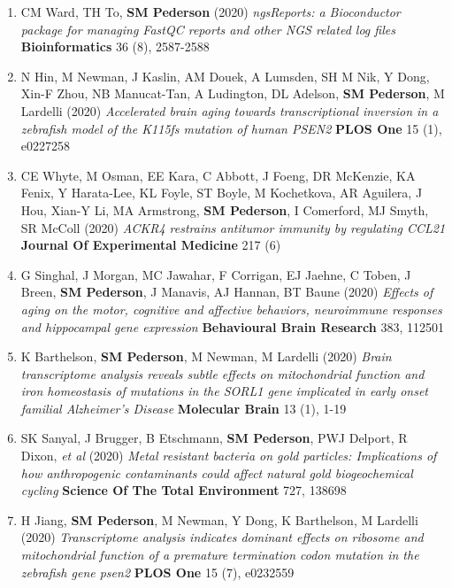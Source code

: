 \documentclass[11pt,a4paper,]{moderncv}
\begin{document}
\begin{enumerate}
  \small
     \item CM Ward, TH To, \textbf{SM Pederson} (2020) \emph{ngsReports: a Bioconductor package for managing FastQC reports and other NGS related log files} \textbf{Bioinformatics} 36 (8), 2587-2588 \\[-3mm] 
     \item N Hin, M Newman, J Kaslin, AM Douek, A Lumsden, SH M Nik, Y Dong, Xin-F Zhou, NB Manucat-Tan, A Ludington, DL Adelson, \textbf{SM Pederson}, M Lardelli (2020) \emph{Accelerated brain aging towards transcriptional inversion in a zebrafish model of the K115fs mutation of human PSEN2} \textbf{PLOS One} 15 (1), e0227258 \\[-3mm] 
     \item CE Whyte, M Osman, EE Kara, C Abbott, J Foeng, DR McKenzie, KA Fenix, Y Harata-Lee, KL Foyle, ST Boyle, M Kochetkova, AR Aguilera, J Hou, Xian-Y Li, MA Armstrong, \textbf{SM Pederson}, I Comerford, MJ Smyth, SR McColl (2020) \emph{ACKR4 restrains antitumor immunity by regulating CCL21} \textbf{Journal Of Experimental Medicine} 217 (6) \\[-3mm] 
     \item G Singhal, J Morgan, MC Jawahar, F Corrigan, EJ Jaehne, C Toben, J Breen, \textbf{SM Pederson}, J Manavis, AJ Hannan, BT Baune (2020) \emph{Effects of aging on the motor, cognitive and affective behaviors, neuroimmune responses and hippocampal gene expression} \textbf{Behavioural Brain Research} 383, 112501 \\[-3mm] 
     \item K Barthelson, \textbf{SM Pederson}, M Newman, M Lardelli (2020) \emph{Brain transcriptome analysis reveals subtle effects on mitochondrial function and iron homeostasis of mutations in the SORL1 gene implicated in early onset familial Alzheimer's Disease} \textbf{Molecular Brain} 13 (1), 1-19 \\[-3mm] 
     \item SK Sanyal, J Brugger, B Etschmann, \textbf{SM Pederson}, PWJ Delport, R Dixon, \emph{et al} (2020) \emph{Metal resistant bacteria on gold particles: Implications of how anthropogenic contaminants could affect natural gold biogeochemical cycling} \textbf{Science Of The Total Environment} 727, 138698 \\[-3mm] 
     \item H Jiang, \textbf{SM Pederson}, M Newman, Y Dong, K Barthelson, M Lardelli (2020) \emph{Transcriptome analysis indicates dominant effects on ribosome and mitochondrial function of a premature termination codon mutation in the zebrafish gene psen2} \textbf{PLOS One} 15 (7), e0232559 \\[-3mm] 

\end{enumerate}
\end{document}
